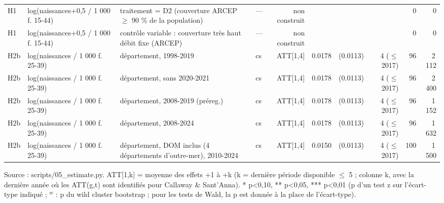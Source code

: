 \begin{table}
\begin{threeparttable}
\begin{tabular}{lp{4.3cm}p{7.5cm}lrrrrrr}
H1 & log(naissances+0,5 / 1 000 f. 15-44) & traitement = D2 (couverture ARCEP $\geq$ 90 \% de la population) & — & non construit &  &  &  & 0 & 0 \\
H1 & log(naissances+0,5 / 1 000 f. 15-44) & contrôle variable : couverture très haut débit fixe (ARCEP) & — & non construit &  &  &  & 0 & 0 \\
H2b & log(naissances / 1 000 f. 25-39) & département, 1998-2019 & cs & ATT[1,4] & 0.0178 & (0.0113) & 4 ($\leq$ 2017) & 96 & 2\,112 \\
H2b & log(naissances / 1 000 f. 25-39) & département, sans 2020-2021 & cs & ATT[1,4] & 0.0178 & (0.0113) & 4 ($\leq$ 2017) & 96 & 2\,400 \\
H2b & log(naissances / 1 000 f. 25-39) & département, 2008-2019 (préreg.) & cs & ATT[1,4] & 0.0178 & (0.0113) & 4 ($\leq$ 2017) & 96 & 1\,152 \\
H2b & log(naissances / 1 000 f. 25-39) & département, 2008-2024 & cs & ATT[1,4] & 0.0178 & (0.0113) & 4 ($\leq$ 2017) & 96 & 1\,632 \\
H2b & log(naissances / 1 000 f. 25-39) & département, DOM inclus (4 départements d'outre-mer), 2010-2024 & cs & ATT[1,4] & 0.0150 & (0.0113) & 4 ($\leq$ 2017) & 100 & 1\,500 \\
\bottomrule
\end{tabular}
\begin{tablenotes}\footnotesize
\item Source : scripts/05\_estimate.py. ATT[1,k] = moyenne des effets +1 à +k (k = dernière période disponible $\leq$ 5 ; colonne k, avec la dernière année où les ATT(g,t) sont identifiés pour Callaway \& Sant'Anna). * p<0,10, ** p<0,05, *** p<0,01 (p d'un test z sur l'écart-type indiqué ; $^{w}$ : p du wild cluster bootstrap ; pour les tests de Wald, la p est donnée à la place de l'écart-type).
\end{tablenotes}
\end{threeparttable}
\end{table}
